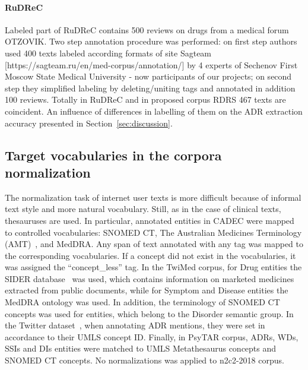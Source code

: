 \documentclass[a4paper,fleqn,longmktitle]{cas-dc}
\begin{document}
\paragraph{RuDReC~\cite{10.1093/bioinformatics/btaa675}}
Labeled part of RuDReC contains 500 reviews on drugs from a medical forum OTZOVIK. Two step annotation procedure was performed: on first step authors used 400 texts labeled according formats of site Sagteam [https://sagteam.ru/en/med-corpus/annotation/] by 4 experts of Sechenov First Moscow State Medical University - now participants of our projects; on second step they simplified labeling by deleting/uniting tags and annotated in addition 100 reviews. Totally in RuDReC and in proposed corpus RDRS 467 texts are coincident. An influence of differences in labelling of them on the ADR extraction accuracy presented in Section~\ref{sec:discussion}.


\subsection{Target vocabularies in the corpora normalization}
The normalization task of internet user texts is more difficult because of informal text style and more natural vocabulary. Still, as in the case of clinical texts, thesauruses are used. In particular, annotated entities in CADEC were mapped to controlled vocabularies: SNOMED CT, The Australian Medicines Terminology (AMT)~\cite{techrepAMT}, and MedDRA. Any span of text annotated with any tag was mapped to the corresponding vocabularies. If a concept did not exist in the vocabularies, it was assigned the ``concept\_less'' tag. In the TwiMed corpus, for Drug entities the SIDER database~\cite{kuhn2015sider} was used, which contains information on marketed medicines extracted from public documents, while for Symptom and Disease entities the MedDRA ontology was used. In addition, the  terminology of SNOMED CT concepts was used for entities, which belong to the Disorder semantic group. In the Twitter dataset~\cite{sarker2016social}, when annotating ADR mentions, they were set in accordance to their UMLS concept ID. Finally, in PsyTAR corpus, ADRs, WDs, SSIs and DIs entities were matched to UMLS Metathesaurus concepts and SNOMED CT concepts. No normalizations was applied to n2c2-2018 corpus. 
\end{document}
